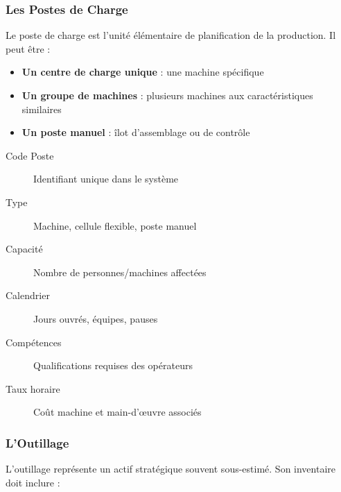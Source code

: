 \documentclass{article}
\begin{document}
\subsubsection{Les Postes de Charge}

Le poste de charge est l'unité élémentaire de planification de la production. Il peut être :

\begin{itemize}
    \item \textbf{Un centre de charge unique} : une machine spécifique
    \item \textbf{Un groupe de machines} : plusieurs machines aux caractéristiques similaires
    \item \textbf{Un poste manuel} : îlot d'assemblage ou de contrôle
\end{itemize}

\begin{tcolorbox}[colback=gray!5!white, colframe=gray!75!black, title=Caractérisation d'un poste de charge]
\begin{description}
    \item[Code Poste] Identifiant unique dans le système
    \item[Type] Machine, cellule flexible, poste manuel
    \item[Capacité] Nombre de personnes/machines affectées
    \item[Calendrier] Jours ouvrés, équipes, pauses
    \item[Compétences] Qualifications requises des opérateurs
    \item[Taux horaire] Coût machine et main-d'œuvre associés
\end{description}
\end{tcolorbox}

\subsubsection{L'Outillage}

L'outillage représente un actif stratégique souvent sous-estimé. Son inventaire doit inclure :
\end{document}

